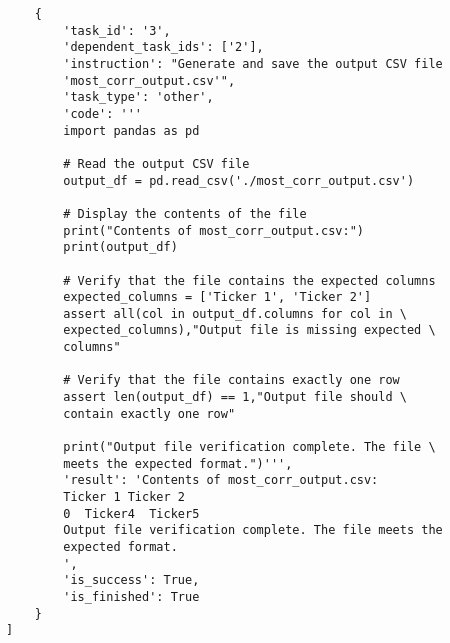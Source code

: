\begin{tcolorbox}[colback=blue!5!white, colframe=blue!75!black, title=Successful case \#4 from Claude-3-5-sonnet-20240620, text width=\textwidth]
\begin{verbatim}
    {
        'task_id': '3',
        'dependent_task_ids': ['2'],
        'instruction': "Generate and save the output CSV file 
        'most_corr_output.csv'",
        'task_type': 'other',
        'code': '''
        import pandas as pd

        # Read the output CSV file
        output_df = pd.read_csv('./most_corr_output.csv')
        
        # Display the contents of the file
        print("Contents of most_corr_output.csv:")
        print(output_df)
        
        # Verify that the file contains the expected columns
        expected_columns = ['Ticker 1', 'Ticker 2']
        assert all(col in output_df.columns for col in \
        expected_columns),"Output file is missing expected \
        columns"
        
        # Verify that the file contains exactly one row
        assert len(output_df) == 1,"Output file should \
        contain exactly one row"
        
        print("Output file verification complete. The file \
        meets the expected format.")''',
        'result': 'Contents of most_corr_output.csv:
        Ticker 1 Ticker 2
        0  Ticker4  Ticker5
        Output file verification complete. The file meets the 
        expected format.
        ',
        'is_success': True,
        'is_finished': True
    }
]
\end{verbatim}
\end{tcolorbox}
